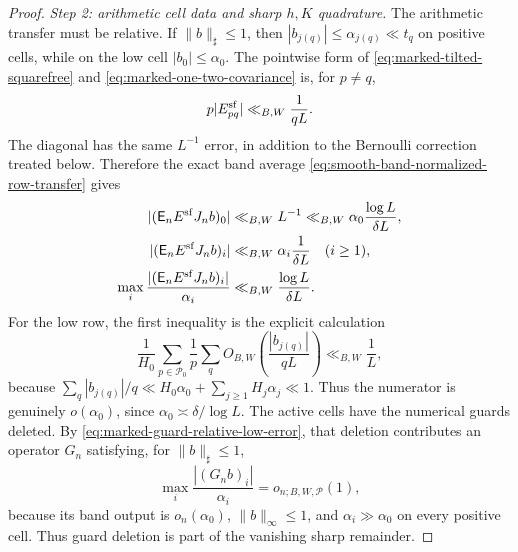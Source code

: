 \documentclass[11pt]{article}
\numberwithin{equation}{section}
\theoremstyle{definition}
\theoremstyle{remark}
\newcommand{\1}{\mathbf 1}
\begin{document}
\begin{proof}
\medskip\noindent
\emph{Step 2: arithmetic cell data and sharp \(h,K\) quadrature.}\quad
The arithmetic transfer must be relative.  If
\(\|b\|_\sharp\leq1\), then \(|b_{j(q)}|\leq\alpha_{j(q)}\ll t_q\) on
positive cells, while on the low cell
\(|b_0|\leq\alpha_0\).  The pointwise form of
\eqref{eq:marked-tilted-squarefree} and
\eqref{eq:marked-one-two-covariance} is, for \(p\ne q\),
\begin{equation}
 p|E_{pq}^{\rm sf}|\ll_{B,W}\frac1{qL}.
 \label{eq:smooth-sharp-pointwise-squarefree-error}
\end{equation}
The diagonal has the same \(L^{-1}\) error, in addition to the
Bernoulli correction treated below.  Therefore the exact band average
\eqref{eq:smooth-band-normalized-row-transfer} gives
\begin{equation}
 \begin{split}
 |(\mathsf E_nE^{\rm sf}J_nb)_0|
   &\ll_{B,W} L^{-1}
       \ll_{B,W}\alpha_0\frac{\log L}{\delta L},\\
 |(\mathsf E_nE^{\rm sf}J_nb)_i|
   &\ll_{B,W}\alpha_i\frac1{\delta L}\quad(i\ge1),\\
 \max_i\frac{|(\mathsf E_nE^{\rm sf}J_nb)_i|}{\alpha_i}
   &\ll_{B,W}\frac{\log L}{\delta L}.
 \end{split}
 \label{eq:smooth-sharp-squarefree-transfer}
\end{equation}
For the low row, the first inequality is the explicit calculation
\[
 \frac1{H_0}\sum_{p\in\mathcal P_0}\frac1p
 \sum_q O_{B,W}\!\left(\frac{|b_{j(q)}|}{qL}\right)
 \ll_{B,W}\frac1L,
\]
because
\(\sum_q|b_{j(q)}|/q\ll
H_0\alpha_0+\sum_{j\ge1}H_j\alpha_j\ll1\).
Thus the numerator is genuinely \(o(\alpha_0)\), since
\(\alpha_0\asymp\delta/\log L\).
The active cells have the numerical guards deleted.  By
\eqref{eq:marked-guard-relative-low-error}, that deletion contributes an
operator \(G_n\) satisfying, for \(\|b\|_\sharp\leq1\),
\begin{equation}
 \max_i\frac{|(G_nb)_i|}{\alpha_i}=o_{n;B,W,\mathcal P}(1),
 \label{eq:smooth-sharp-guard-deletion}
\end{equation}
because its band output is \(o_n(\alpha_0)\),
\(\|b\|_\infty\leq1\), and \(\alpha_i\gg\alpha_0\) on every positive
cell.  Thus guard deletion is part of the vanishing sharp remainder.


\end{proof}
\end{document}
